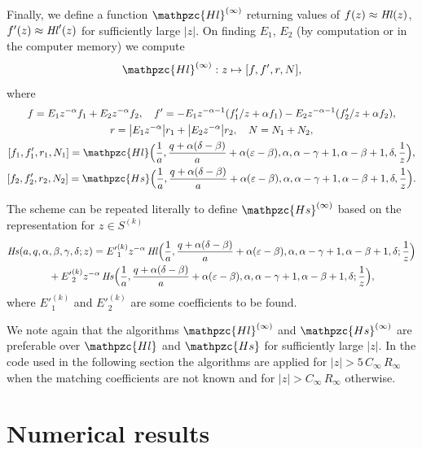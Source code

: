 \documentclass[11pt]{article}
\newcommand{\MF}[1]{\mathop{#1}\nolimits}
\newcommand{\SectInf}{S}%
\def\HeunL{\MF{\textit{Hl\/}}}%
\def\HeunS{\MF{\textit{Hs\/}}}%
\def\psHeunLfin{\mathpzc{Hl}}%
\def\psHeunSfin{\mathpzc{Hs}}%
\def\psHeunLnearinf{\mathpzc{Hl}^{(\infty)}}%
\def\psHeunSnearinf{\mathpzc{Hs}^{(\infty)}}%
\begin{document}
Finally, we define a function $\psHeunLnearinf$ returning values of
$f(z)\approx\HeunL(z)$, $f'(z)\approx\HeunL'(z)$ for sufficiently large $|z|$.
On finding $E_1$, $E_2$ (by computation or in the computer memory) we compute
\begin{equation*}
 \psHeunLnearinf: z\mapsto [f,f',r,N],
\end{equation*}
where 
\begin{gather*}
 f= E_1 z^{-\alpha}f_1 + E_2 z^{-\alpha}f_2,\quad
 f'=
 -E_1 z^{-\alpha-1}(f'_1/z+\alpha f_1) - E_2 z^{-\alpha-1} (f'_2/z+\alpha f_2),\\
 r=\bigl|E_1 z^{-\alpha}\bigr|r_1 +\bigl|E_2 z^{-\alpha}\bigr|r_2,\quad
 N = N_1 + N_2,\\
 [f_1,f'_1,r_1,N_1]=\psHeunLfin\Bigl(\frac{1}{a},\frac{q+\alpha(\delta-\beta)}{a}+
\alpha(\varepsilon-\beta),\alpha,\alpha-\gamma+1,\alpha-\beta+1,\delta,\frac{1}{z}\Bigr),\\
 [f_2,f'_2,r_2,N_2]=\psHeunSfin\Bigl(\frac{1}{a},\frac{q+\alpha(\delta-\beta)}{a}+
\alpha(\varepsilon-\beta),\alpha,\alpha-\gamma+1,\alpha-\beta+1,\delta,\frac{1}{z}\Bigr).
\end{gather*}

The scheme can be repeated literally to define $\psHeunSnearinf$ based on the
representation for $z\in\SectInf^{(k)}$
\begin{multline*}
\HeunS(a,q,\alpha,\beta,\gamma,\delta;z) = {E'}^{(k)}_1 z^{-\alpha}
\HeunL\Bigl(\frac{1}{a},\frac{q+\alpha(\delta-\beta)}{a}+
\alpha(\varepsilon-\beta),\alpha,\alpha-\gamma+1,\alpha-\beta+1,\delta;\frac{1}{z}\Bigr)
\\ {}+{E'}^{(k)}_2 z^{-\alpha}
\HeunS\Bigl(\frac{1}{a},\frac{q+\alpha(\delta-\beta)}{a}+
\alpha(\varepsilon-\beta),\alpha,\alpha-\gamma+1,\alpha-\beta+1,\delta;\frac{1}{z}\Bigr),
\end{multline*}
where ${E'}^{(k)}_1$ and ${E'}^{(k)}_2$ are some coefficients to be found.

We note again that the algorithms $\psHeunLnearinf$ and $\psHeunSnearinf$ are
preferable over $\psHeunLfin$ and $\psHeunSfin$  for sufficiently large $|z|$.
In the code used in the following section the algorithms are applied for
$|z|>5\, C_\infty\,R_\infty$ when the matching coefficients are not known and
for $|z|>C_\infty\,R_\infty$ otherwise.

\section{Numerical results}
\label{sect:num}
\end{document}
